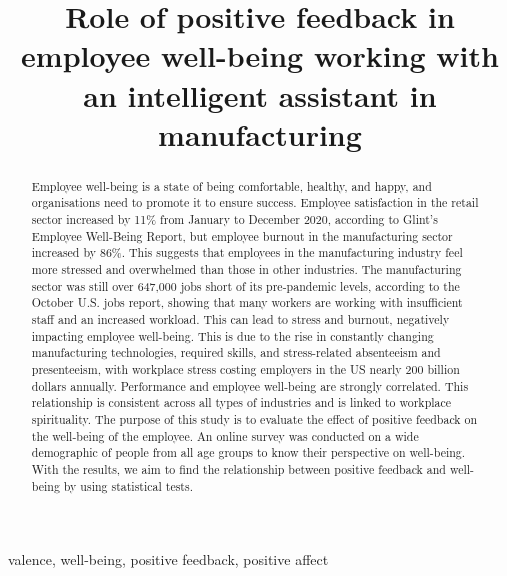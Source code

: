 \documentclass[conference]{IEEEtran}
\begin{document}
\title{Role of positive feedback in employee well-being working with an intelligent assistant in manufacturing\\
}

\author{

}

\maketitle

\begin{abstract}
	Employee well-being is a state of being comfortable, healthy, and happy, and organisations need to promote it to ensure success. Employee satisfaction in the retail sector increased by 11\% from January to December 2020, according to Glint's Employee Well-Being Report, but employee burnout in the manufacturing sector increased by 86\%. This suggests that employees in the manufacturing industry feel more stressed and overwhelmed than those in other industries. The manufacturing sector was still over 647,000 jobs short of its pre-pandemic levels, according to the October U.S. jobs report, showing that many workers are working with insufficient staff and an increased workload. This can lead to stress and burnout, negatively impacting employee well-being. This is due to the rise in constantly changing manufacturing technologies, required skills, and stress-related absenteeism and presenteeism, with workplace stress costing employers in the US nearly 200 billion dollars annually. Performance and employee well-being are strongly correlated. This relationship is consistent across all types of industries and is linked to workplace spirituality. The purpose of this study is to evaluate the effect of positive feedback on the well-being of the employee. An online survey was conducted on a wide demographic of people from all age groups to know their perspective on well-being. With the results, we aim to find the relationship between positive feedback and well-being by using statistical tests. 
\end{abstract}

\begin{IEEEkeywords}
	valence, well-being, positive feedback, positive affect
\end{IEEEkeywords}
\end{document}
